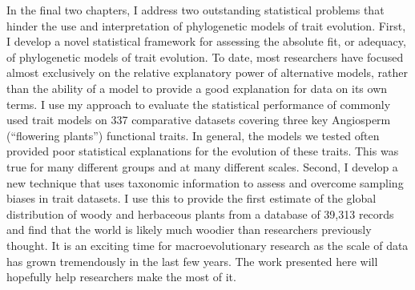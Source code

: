 In the final two chapters, I address two outstanding statistical problems that hinder the use and interpretation of phylogenetic models of trait evolution. First, I develop a novel statistical framework for assessing the absolute fit, or adequacy, of phylogenetic models of trait evolution. To date, most researchers have focused almost exclusively on the relative explanatory power of alternative models, rather than the ability of a model to provide a good explanation for data on its own terms. I use my approach to evaluate the statistical performance of commonly used trait models on 337 comparative datasets covering three key Angiosperm (``flowering plants'') functional traits. In general, the models we tested often provided poor statistical explanations for the evolution of these traits. This was true for many different groups and at many different scales. Second, I develop a new technique that uses taxonomic information to assess and overcome sampling biases in trait datasets. I use this to provide the first estimate of the global distribution of woody and herbaceous plants from a database of 39,313 records and find that the world is likely much woodier than researchers previously thought. It is an exciting time for macroevolutionary research as the scale of data has grown tremendously in the last few years. The work presented here will hopefully help researchers make the most of it.

